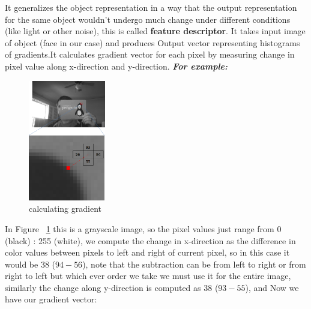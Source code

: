 It generalizes the object representation in a way that the output representation for the same object wouldn’t undergo much change under different conditions (like light or other noise), this is called \textbf{feature descriptor}.
It takes input image of object (face in our case) and produces Output vector representing histograms of gradients.\newline It calculates gradient vector for each pixel by measuring change in pixel value along x-direction and y-direction. \newline \newline \textbf{\textit{For example:}}\newline
\begin{figure}
    \centering
	\includegraphics[width=0.3\textwidth]{images/hog_pixel_ex.png}
	\caption{calculating gradient}
	\label{fig:calculating gradient}
\end{figure}
In Figure ~\ref{fig:calculating gradient} this is a grayscale image, so the pixel values just range from 0 (black) : 255 (white), we compute the change in x-direction as the difference in color values between pixels to left and right of current pixel, so in this case it would be 38 ($94 - 56$), note that the subtraction can be from left to right or from right to left but which ever order we take we must use it for the entire image, similarly the change along y-direction is computed as 38 ($93 - 55$), and Now we have our gradient vector:
